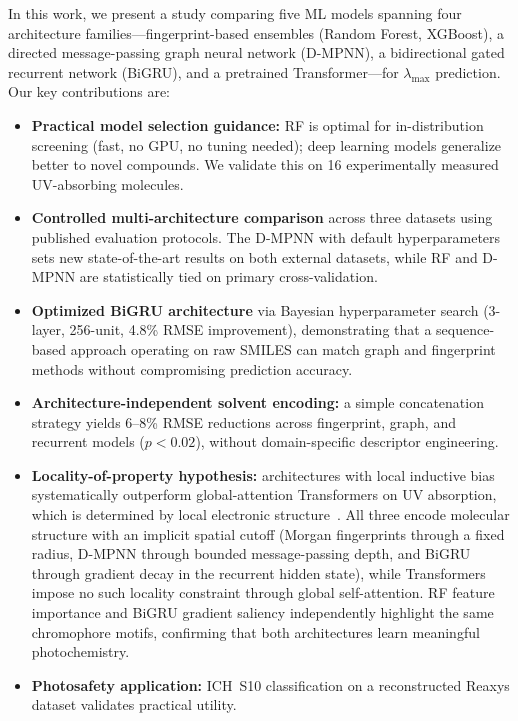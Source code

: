 \documentclass[journal=jcisd8,manuscript=article]{achemso}
\begin{document}
In this work, we present a study comparing five ML models spanning four architecture families---fingerprint-based ensembles (Random Forest, XGBoost), a directed message-passing graph neural network (D-MPNN), a bidirectional gated recurrent network (BiGRU), and a pretrained Transformer---for $\lambda_{\max}$ prediction.
Our key contributions are:
\begin{itemize}
    \item \textbf{Practical model selection guidance:} RF is optimal for in-distribution screening (fast, no GPU, no tuning needed); deep learning models generalize better to novel compounds. We validate this on 16 experimentally measured UV-absorbing molecules.
    \item \textbf{Controlled multi-architecture comparison} across three datasets using published evaluation protocols. The D-MPNN with default hyperparameters sets new state-of-the-art results on both external datasets, while RF and D-MPNN are statistically tied on primary cross-validation.
    \item \textbf{Optimized BiGRU architecture} via Bayesian hyperparameter search (3-layer, 256-unit, 4.8\% RMSE improvement), demonstrating that a sequence-based approach operating on raw SMILES can match graph and fingerprint methods without compromising prediction accuracy.
    \item \textbf{Architecture-independent solvent encoding:} a simple concatenation strategy yields 6--8\% RMSE reductions across fingerprint, graph, and recurrent models ($p < 0.02$), without domain-specific descriptor engineering.
    \item \textbf{Locality-of-property hypothesis:} architectures with local inductive bias systematically outperform global-attention Transformers on UV absorption, which is determined by local electronic structure~\cite{chenMolecularLanguage2023}. All three encode molecular structure with an implicit spatial cutoff (Morgan fingerprints through a fixed radius, D-MPNN through bounded message-passing depth, and BiGRU through gradient decay in the recurrent hidden state), while Transformers impose no such locality constraint through global self-attention. RF feature importance and BiGRU gradient saliency independently highlight the same chromophore motifs, confirming that both architectures learn meaningful photochemistry.
    \item \textbf{Photosafety application:} ICH~S10 classification on a reconstructed Reaxys dataset validates practical utility.
\end{itemize}
\end{document}
